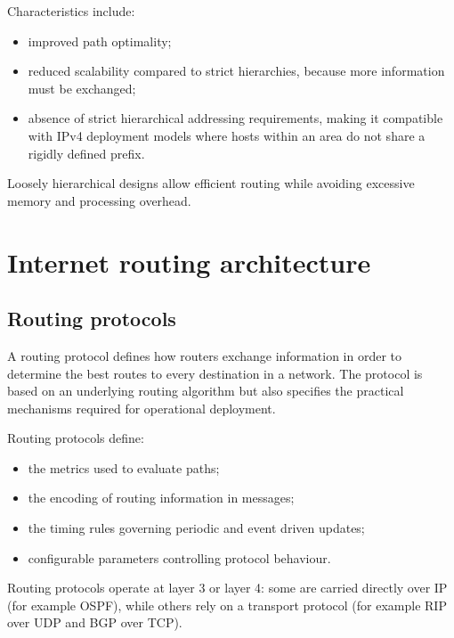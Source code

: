 Characteristics include:

\begin{itemize}
\item improved path optimality;
\item reduced scalability compared to strict hierarchies, because more information must be exchanged;
\item absence of strict hierarchical addressing requirements, making it compatible with IPv4 deployment models where hosts within an area do not share a rigidly defined prefix.
\end{itemize}

Loosely hierarchical designs allow efficient routing while avoiding excessive memory and processing overhead.

\section{Internet routing architecture}

\subsection{Routing protocols}
 
A routing protocol defines how routers exchange information in order to determine the best routes to every destination in a network. The protocol is based on an underlying routing algorithm but also specifies the practical mechanisms required for operational deployment.

\begin{center}
\end{center}


Routing protocols define:

\begin{itemize}
\item the metrics used to evaluate paths;
\item the encoding of routing information in messages;
\item the timing rules governing periodic and event driven updates;
\item configurable parameters controlling protocol behaviour.
\end{itemize}

Routing protocols operate at layer 3 or layer 4: some are carried directly over
IP (for example OSPF), while others rely on a transport protocol (for example
RIP over UDP and BGP over TCP).

